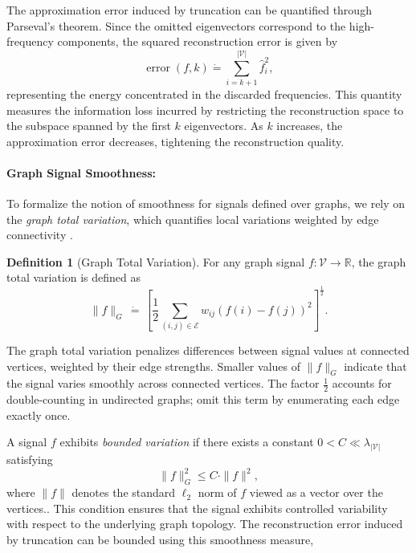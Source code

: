 \documentclass{article}
\theoremstyle{plain}
\theoremstyle{definition}
\newtheorem{definition}[theorem]{Definition}
\theoremstyle{remark}
\begin{document}
The approximation error induced by truncation can be quantified through Parseval's theorem. Since the omitted eigenvectors correspond to the high-frequency components, the squared reconstruction error is given by
\begin{equation}
    \operatorname{error}(f,k) \dot{=} \sum_{i = k+1}^{|\mathscr{V}|} \hat{f}_i^2,
\end{equation}
representing the energy concentrated in the discarded frequencies. This quantity measures the information loss incurred by restricting the reconstruction space to the subspace spanned by the first $k$ eigenvectors. As $k$ increases, the approximation error decreases, tightening the reconstruction quality.

\paragraph{Graph Signal Smoothness:} 
To formalize the notion of smoothness for signals defined over graphs, we rely on the \textit{graph total variation}, which quantifies local variations weighted by edge connectivity \citep{zhu2012approximating}.

\begin{definition}[Graph Total Variation]
For any graph signal $f: \mathscr{V} \to \mathbb{R}$, the graph total variation is defined as
\begin{equation}
    \|f\|_G \, \dot{=} \, \left[ \frac{1}{2}  \sum_{(i,j) \in \mathscr{E}} w_{ij} (f(i) - f(j))^2\right]^{\frac{1}{2}}.    
\end{equation}
\end{definition}

The graph total variation penalizes differences between signal values at connected vertices, weighted by their edge strengths. Smaller values of $\|f\|_G$ indicate that the signal varies smoothly across connected vertices. The factor $\frac{1}{2}$ accounts for double-counting in undirected graphs; \citet{zhu2012approximating} omit this term by enumerating each edge exactly once. 

A signal $f$ exhibits \textit{bounded variation} if there exists a constant $0 < C \ll \lambda_{|\mathscr{V}|}$ satisfying
\begin{equation}
\|f\|_G^2 \le C \cdot \|f\|^2,
\label{eqn:bounded_variation}
\end{equation}
where $\|f\|$ denotes the standard $\ell_2$ norm of $f$ viewed as a vector over the vertices.. This condition ensures that the signal exhibits controlled variability with respect to the underlying graph topology. The reconstruction error induced by truncation can be bounded using this smoothness measure,
\end{document}
